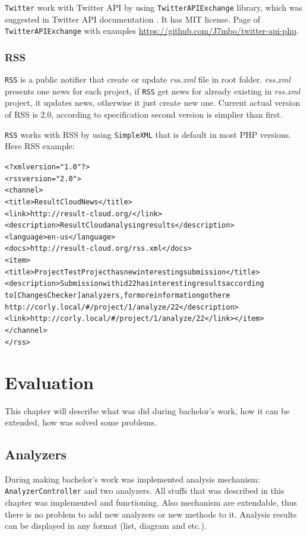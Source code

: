 \texttt{Twitter} work with Twitter API by using \texttt{TwitterAPIExchange} library, which was suggested in Twitter API documentation \cite{twitter}. It has MIT license. Page of \texttt{TwitterAPIExchange} with examples \url{https://github.com/J7mbo/twitter-api-php}.

\subsection{RSS}

\texttt{RSS} is a public notifier that create or update \emph{rss.xml} file in root folder. \emph{rss.xml} presents one news for each project, if \texttt{RSS} get news for already existing in \emph{rss.xml} project, it updates news, otherwise it just create new one. Current actual version of RSS is 2.0, according to specification \cite{rss} second version is simplier than first.

\texttt{RSS} works with RSS by using \texttt{SimpleXML} that is default in most PHP versions. Here RSS example:
\begin{alltt}
<?xml version="1.0"?>
<rss version="2.0"> 
<channel>
<title>ResultCloud News</title>
<link>http://result-cloud.org/</link>
<description>ResultCloud analysing results</description>
<language>en-us</language>
<docs>http://result-cloud.org/rss.xml</docs>
<item>
<title>Project TestProject has new interesting submission</title>
<description>Submission with id 22 has interesting results according\\ to [ChangesChecker] analyzers, for more information go there\\ http://corly.local/#/project/1/analyze/22</description>
<link>http://corly.local/#/project/1/analyze/22</link></item>
</channel>
</rss>

\end{alltt}

\chapter{Evaluation}

This chapter will describe what was did during bachelor's work, how it can be extended, how was solved some problems.

\section{Analyzers}

During making bachelor's work was implemented analysis mechanism: \texttt{AnalyzerController} and two analyzers. All stuffs that was described in this chapter was implemented and functioning. Also mechanism are extendable, thus there is no problem to add new analyzers or new methods to it. Analysis results can be displayed in any format (list, diagram and etc.).


